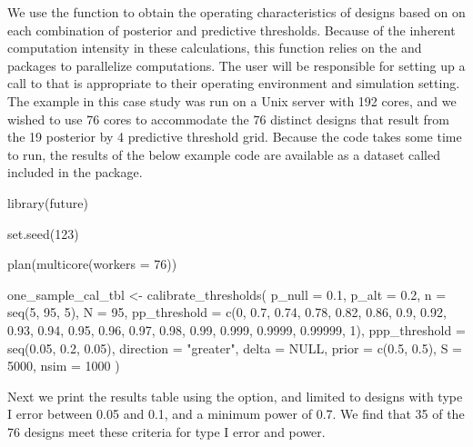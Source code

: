 We use the  function to obtain the
operating characteristics of designs based on on each combination of
posterior and predictive thresholds. Because of the inherent computation
intensity in these calculations, this function relies on the
 \citep{Bengtsson2020} and 
\citep{Vaughan2021} packages to parallelize computations. The user will
be responsible for setting up a call to  that is
appropriate to their operating environment and simulation setting. The
example in this case study was run on a Unix server with 192 cores, and
we wished to use 76 cores to accommodate the 76 distinct designs that
result from the 19 posterior by 4 predictive threshold grid. Because the
code takes some time to run, the results of the below example code are
available as a dataset called  included in
the  package.

\begin{Schunk}
\begin{Sinput}
library(future)

set.seed(123)

plan(multicore(workers = 76))

one_sample_cal_tbl <- 
  calibrate_thresholds(
    p_null = 0.1, 
    p_alt = 0.2, 
    n = seq(5, 95, 5),
    N = 95, 
    pp_threshold = c(0, 0.7, 0.74, 0.78, 0.82, 0.86, 0.9, 0.92, 0.93, 0.94, 
                     0.95, 0.96, 0.97, 0.98, 0.99, 0.999, 0.9999, 0.99999, 1),
    ppp_threshold = seq(0.05, 0.2, 0.05),
    direction = "greater", 
    delta = NULL, 
    prior = c(0.5, 0.5), 
    S = 5000, 
    nsim = 1000
  )
\end{Sinput}
\end{Schunk}

Next we print the results table using the  option, and
limited to designs with type I error between 0.05 and 0.1, and a minimum
power of 0.7. We find that 35 of the 76 designs meet these criteria for
type I error and power.

